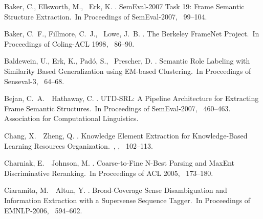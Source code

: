 \documentclass[english]{jnlp_1.4_rep}
\begin{document}

\begin{thebibliography}{}

Baker, C., Ellsworth, M., \BBA\ Erk, K. \BBCP.
\newblock \BBOQ SemEval-2007 Task 19: Frame Semantic Structure
  Extraction.\BBCQ\
\newblock In {\Bem Proceedings of SemEval-2007}, \mbox{\BPGS\ 99--104}.

Baker, C.~F., Fillmore, C.~J., \BBA\ Lowe, J.~B. \BBCP.
\newblock \BBOQ The Berkeley FrameNet Project.\BBCQ\
\newblock In {\Bem Proceedings of Coling-ACL 1998}, \mbox{\BPGS\ 86--90}.

Baldewein, U., Erk, K., Pad{\'{o}}, S., \BBA\ Prescher, D. \BBOP 2004\BBCP.
\newblock \BBOQ Semantic Role Labeling with Similarity Based Generalization
  using EM-based Clustering.\BBCQ\
\newblock In {\Bem Proceedings of Senseval-3}, \mbox{\BPGS\ 64--68}.

Bejan, C.~A.\BBACOMMA\ \BBA\ Hathaway, C. \BBOP 2007\BBCP.
\newblock \BBOQ UTD-SRL: A Pipeline Architecture for Extracting Frame Semantic
  Structures.\BBCQ\
\newblock In {\Bem Proceedings of SemEval-2007}, \mbox{\BPGS\ 460--463}.
  Association for Computational Linguistics.

Chang, X.\BBACOMMA\ \BBA\ Zheng, Q. \BBCP.
\newblock \BBOQ Knowledge Element Extraction for Knowledge-Based Learning
  Resources Organization.\BBCQ\
, {}, \mbox{\BPGS\
  102--113}.

Charniak, E.\BBACOMMA\ \BBA\ Johnson, M. \BBCP.
\newblock \BBOQ Coarse-to-Fine N-Best Parsing and MaxEnt Discriminative
  Reranking.\BBCQ\
\newblock In {\Bem Proceedings of ACL 2005}, \mbox{\BPGS\ 173--180}.

Ciaramita, M.\BBACOMMA\ \BBA\ Altun, Y. \BBCP.
\newblock \BBOQ Broad-Coverage Sense Disambiguation and Information Extraction
  with a Supersense Sequence Tagger.\BBCQ\
\newblock In {\Bem Proceedings of EMNLP-2006}, \mbox{\BPGS\ 594--602}.


\end{thebibliography}
\end{document}
